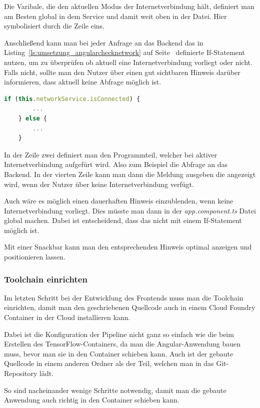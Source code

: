 Die Varibale, die den aktuellen Modus der Internetverbindung hält, definiert man am Besten global in dem Service und
damit weit oben in der Datei. Hier symbolisiert durch die Zeile eins.

Anschließend kann man bei jeder Anfrage an das Backend das in Listing~\ref{ls:umsetzung_angularchecknetwork} auf
Seite~\pageref{ls:umsetzung_angularchecknetwork} definierte If-Statement nutzen, um zu überprüfen ob aktuell eine
Internetverbindung vorliegt oder nicht. Falls nicht, sollte man den Nutzer über einen gut sichtbaren Hinweis darüber
informieren, dass aktuell keine Abfrage möglich ist.

\begin{lstlisting}[language=JavaScript, caption=Überprüfung ob eine Internetverbindung vorliegt, label=ls:umsetzung_angularchecknetwork]
    if (this.networkService.isConnected) {
        ...
    } else {
        ...
    }
\end{lstlisting}

In der Zeile zwei definiert man den Programmteil, welcher bei aktiver Internetverbindung aufgefürt wird. Also zum
Beispiel die Abfrage an das Backend. In der vierten Zeile kann man dann die Meldung ausgeben die angezeigt wird, wenn
der Nutzer über keine Internetverbindung verfügt.

Auch wäre es möglich einen dauerhaften Hinweis einzublenden, wenn keine Internetverbindung vorliegt. Dies müsste man dann
in der \textit{app.component.ts} Datei global machen. Dabei ist entscheidend, dass das nicht mit einem If-Statement
möglich ist.

Mit einer Snackbar kann man den entsprechenden Hinweis optimal anzeigen und positionieren lassen.

\subsubsection{Toolchain einrichten}
Im letzten Schritt bei der Entwicklung des Frontends muss man die Toolchain einrichten, damit man den geschriebenen
Quellcode auch in einem Cloud Foundry Container in der Cloud installieren kann.

Dabei ist die Konfiguration der Pipeline nicht ganz so einfach wie die beim Erstellen des TensorFlow-Containers, da man
die Angular-Anwendung bauen muss, bevor man sie in den Container schieben kann. Auch ist der gebaute Quellcode in einem
anderen Ordner als der Teil, welchen man in das Git-Repository lädt.

So sind nacheinander wenige Schritte notwendig, damit man die gebaute Anwendung auch richtig in den Container schieben
kann.


